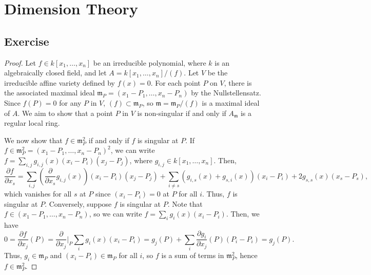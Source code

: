 \section{Dimension Theory}

\subsection{Exercise}\label{11.1}

\begin{proof}
Let $f \in k[x_1,\ldots,x_n]$ be an irreducible polynomial, where $k$ is an algebraically closed field, and let 
$A = k[x_1,\ldots,x_n]/(f)$. Let $V$ be the irreducible affine variety defined by $f(x) = 0$. For each point $P$ on $V$, 
there is the associated maximal ideal $\mathfrak{m}_P = (x_1 - P_1, \ldots, x_n - P_n)$ by the Nullstellensatz. Since 
$f(P) = 0$ for any $P$ in $V$, $(f) \subset \mathfrak{m}_P$, so $\mathfrak{m} = \mathfrak{m}_P / (f)$ is a maximal ideal 
of $A$. We aim to show that a point $P$ in $V$ is non-singular if and only if $A_{\mathfrak{m}}$ is a regular local ring.

We now show that $f \in \mathfrak{m}_P^2$ if and only if $f$ is singular at $P$. If $f \in \mathfrak{m}_P^2 = (x_1 - P_1, \ldots, x_n - P_n)^2$, 
we can write $f = \sum_{i,j} g_{i,j}(x)(x_i - P_i)(x_j - P_j)$, where $g_{i,j} \in k[x_1,\ldots,x_n]$. Then,
$$\frac{\partial f}{\partial x_s} = \sum_{i,j}\left(\frac{\partial}{\partial x_s}g_{i,j}(x)\right)(x_i - P_i)(x_j - P_j) + \sum_{i \neq s} (g_{i,s}(x) + g_{s,i}(x))(x_i - P_i) + 2 g_{s,s}(x)(x_s - P_s),$$
which vanishes for all $s$ at $P$ since $(x_i - P_i) = 0$ at $P$ for all $i$. Thus, $f$ is singular at $P$. Conversely, 
suppose $f$ is singular at $P$. Note that $f \in (x_1 - P_1, \ldots, x_n - P_n)$, so we can write $f = \sum_i g_i(x) (x_i - P_i)$. 
Then, we have 
$$0 = \frac{\partial f}{\partial x_j}(P) = \frac{\partial}{\partial x_j}\bigg\vert_{P}\sum_i g_i(x) (x_i - P_i) = g_j(P) + \sum_i \frac{\partial g_i}{\partial x_j}(P) (P_i - P_i) = g_j(P).$$
Thus, $g_i \in \mathfrak{m}_P$ and $(x_i - P_i) \in \mathfrak{m}_P$ for all $i$, so $f$ is a sum of terms in $\mathfrak{m}_P^2$, hence $f \in \mathfrak{m}_P^2$.


\end{proof}
